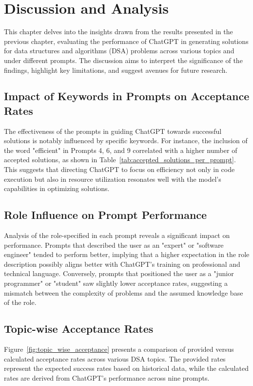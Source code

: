 \chapter{Discussion and Analysis}
\label{ch:discussion}

This chapter delves into the insights drawn from the results presented in the previous chapter, evaluating the performance of ChatGPT in generating solutions for data structures and algorithms (DSA) problems across various topics and under different prompts. The discussion aims to interpret the significance of the findings, highlight key limitations, and suggest avenues for future research.

\section{Impact of Keywords in Prompts on Acceptance Rates}
The effectiveness of the prompts in guiding ChatGPT towards successful solutions is notably influenced by specific keywords. For instance, the inclusion of the word "efficient" in Prompts 4, 6, and 9 correlated with a higher number of accepted solutions, as shown in Table~\ref{tab:accepted_solutions_per_prompt}. This suggests that directing ChatGPT to focus on efficiency not only in code execution but also in resource utilization resonates well with the model's capabilities in optimizing solutions.

\section{Role Influence on Prompt Performance}
Analysis of the role-specified in each prompt reveals a significant impact on performance. Prompts that described the user as an "expert" or "software engineer" tended to perform better, implying that a higher expectation in the role description possibly aligns better with ChatGPT's training on professional and technical language. Conversely, prompts that positioned the user as a "junior programmer" or "student" saw slightly lower acceptance rates, suggesting a mismatch between the complexity of problems and the assumed knowledge base of the role.

\section{Topic-wise Acceptance Rates}
Figure~\ref{fig:topic_wise_acceptance} presents a comparison of provided versus calculated acceptance rates across various DSA topics. The provided rates represent the expected success rates based on historical data, while the calculated rates are derived from ChatGPT's performance across nine prompts.

